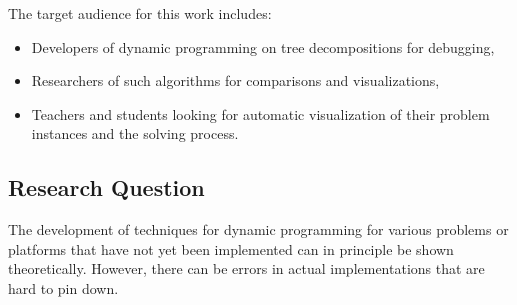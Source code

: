 \documentclass[a4paper, 12pt, bibliography=totoc]{scrartcl}
\begin{document}
The target audience for this work includes: 
\begin{itemize}
	\item Developers of dynamic programming on tree decompositions for debugging,
	\item Researchers of such algorithms for comparisons and visualizations,
	\item Teachers and students looking for automatic visualization of their problem instances and the solving process.
\end{itemize} 


\subsection{Research Question}
The development of techniques for dynamic programming for various problems or platforms that have not yet been implemented can in principle be shown theoretically. However, there can be errors in actual implementations that are hard to pin down. 
\end{document}
